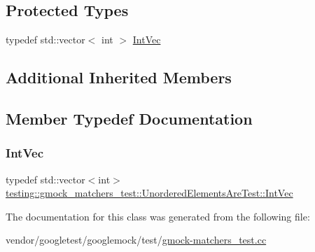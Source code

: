 \subsection*{Protected Types}
\begin{DoxyCompactItemize}
\item 
typedef std\+::vector$<$ int $>$ \hyperlink{classtesting_1_1gmock__matchers__test_1_1_unordered_elements_are_test_a608750c71652943bd11fe7bb5281588d}{Int\+Vec}
\end{DoxyCompactItemize}
\subsection*{Additional Inherited Members}


\subsection{Member Typedef Documentation}
\mbox{\label{classtesting_1_1gmock__matchers__test_1_1_unordered_elements_are_test_a608750c71652943bd11fe7bb5281588d}} 
\subsubsection{\texorpdfstring{Int\+Vec}{IntVec}}
{\footnotesize\ttfamily typedef std\+::vector$<$int$>$ \hyperlink{classtesting_1_1gmock__matchers__test_1_1_unordered_elements_are_test_a608750c71652943bd11fe7bb5281588d}{testing\+::gmock\+\_\+matchers\+\_\+test\+::\+Unordered\+Elements\+Are\+Test\+::\+Int\+Vec}\hspace{0.3cm}{\ttfamily [protected]}}



The documentation for this class was generated from the following file\+:\begin{DoxyCompactItemize}
\item 
vendor/googletest/googlemock/test/\hyperlink{gmock-matchers__test_8cc}{gmock-\/matchers\+\_\+test.\+cc}\end{DoxyCompactItemize}
